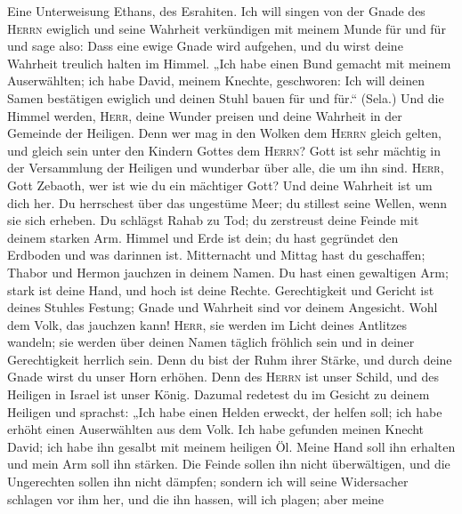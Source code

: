  Eine Unterweisung Ethans, des Esrahiten. 
Ich will singen von der Gnade des \textsc{Herrn} ewiglich und seine
Wahrheit verkündigen mit meinem Munde für und für  und
sage also: Dass eine ewige Gnade wird aufgehen, und du wirst deine
Wahrheit treulich halten im Himmel.  „Ich habe einen Bund
gemacht mit meinem Auserwählten; ich habe David, meinem Knechte,
geschworen:  Ich will deinen Samen bestätigen ewiglich und
deinen Stuhl bauen für und für.`` (Sela.)  Und die Himmel
werden, \textsc{Herr}, deine Wunder preisen und deine Wahrheit in der
Gemeinde der Heiligen.  Denn wer mag in den Wolken dem
\textsc{Herrn} gleich gelten, und gleich sein unter den Kindern Gottes
dem \textsc{Herrn}?  Gott ist sehr mächtig in der
Versammlung der Heiligen und wunderbar über alle, die um ihn sind.
 \textsc{Herr}, Gott Zebaoth, wer ist wie du ein mächtiger
Gott? Und deine Wahrheit ist um dich her.  Du herrschest
über das ungestüme Meer; du stillest seine Wellen, wenn sie sich
erheben.  Du schlägst Rahab zu Tod; du zerstreust deine
Feinde mit deinem starken Arm.  Himmel und Erde ist dein;
du hast gegründet den Erdboden und was darinnen ist. 
Mitternacht und Mittag hast du geschaffen; Thabor und Hermon jauchzen in
deinem Namen.  Du hast einen gewaltigen Arm; stark ist
deine Hand, und hoch ist deine Rechte.  Gerechtigkeit und
Gericht ist deines Stuhles Festung; Gnade und Wahrheit sind vor deinem
Angesicht.  Wohl dem Volk, das jauchzen kann!
\textsc{Herr}, sie werden im Licht deines Antlitzes wandeln;
 sie werden über deinen Namen täglich fröhlich sein und
in deiner Gerechtigkeit herrlich sein.  Denn du bist der
Ruhm ihrer Stärke, und durch deine Gnade wirst du unser Horn erhöhen.
 Denn des \textsc{Herrn} ist unser Schild, und des
Heiligen in Israel ist unser König.  Dazumal redetest du
im Gesicht zu deinem Heiligen und sprachst: „Ich habe einen Helden
erweckt, der helfen soll; ich habe erhöht einen Auserwählten aus dem
Volk.  Ich habe gefunden meinen Knecht David; ich habe
ihn gesalbt mit meinem heiligen Öl.  Meine Hand soll ihn
erhalten und mein Arm soll ihn stärken.  Die Feinde
sollen ihn nicht überwältigen, und die Ungerechten sollen ihn nicht
dämpfen;  sondern ich will seine Widersacher schlagen vor
ihm her, und die ihn hassen, will ich plagen;  aber meine
